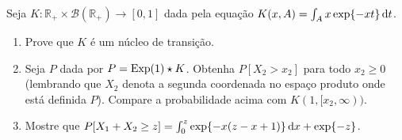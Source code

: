 \begin{exercise}
  Seja $K:\mathbb{R}_+ \times \mathcal{B}(\mathbb{R}_+) \to [0,1]$ dada pela equação $K(x,A) = \int_A x \exp\{-x t\} \mathop{}\!\mathrm{d} t$.
  \begin{enumerate}[\quad a)]
  \item Prove que $K$ \'e um n\'ucleo de transi\c{c}\~ao.
  \item Seja $P$ dada por $P = \textnormal{Exp}(1) \star K$.
    Obtenha $P[X_2 > x_2]$ para todo $x_2 \geq 0$ (lembrando que $X_2$ denota a segunda coordenada no espa\c{c}o produto onde est\'a definida $P$).
    Compare a probabilidade acima com $K(1,[x_2, \infty))$.
  \item Mostre que $P[X_1 + X_2 \geq z] = \int_0^z \exp \{-x(z-x+1)\} \mathop{}\!\mathrm{d} x + \exp\{-z\}$.
  \end{enumerate}
\end{exercise}



\vfill
\pagebreak

